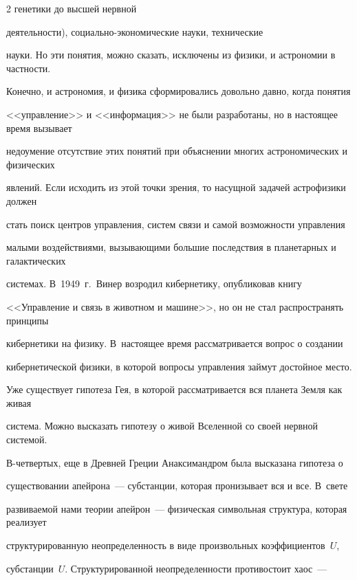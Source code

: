\begin{multicols}{2}
генетики до высшей нервной\linebreak


деятельности), социально-экономические науки, технические 


науки. Но эти понятия, можно сказать, исключены из физики, и астрономии в частности. 


Конечно, и астрономия, и физика сформировались довольно давно, когда понятия 


<<управ\-ле\-ние>> и <<информация>> не были разработаны, но в настоящее время вызывает 


недоумение отсутствие этих понятий при объяснении многих астрономических и физических 


явлений. Если исходить из этой точки зрения, то насущной задачей астрофизики должен 


стать поиск центров управ\-ле\-ния, систем связи и самой возможности управ\-ле\-ния 


малыми воздействиями, вызывающими большие последствия в планетарных и галактических 


сис\-те\-мах. В~1949~г.\ Винер возродил кибернетику, опубликовав книгу 


<<Управ\-ле\-ние и связь в животном и машине>>, но он не стал распространять принципы 


кибернетики на физику. В~настоящее время рассматривается вопрос о создании 


кибернетической физики, в которой вопросы управ\-ле\-ния займут достойное место.


      


      Уже существует гипотеза Гея, в которой рас\-смат\-ри\-ва\-ет\-ся вся планета Земля как живая 


сис\-те\-ма. Можно высказать гипотезу о живой Вселенной со своей нервной сис\-те\-мой.


      


      В-чет\-вер\-тых, еще в Древней Греции Анаксимандром была высказана гипотеза о 


существовании апейрона~--- субстанции, которая пронизывает вся и все. В~свете 


развиваемой нами теории апейрон~--- физическая символьная структура, которая реализует 


структурированную неопределенность в виде произвольных коэффициентов~$U$, 


субстанции~$U$. Структурированной неопределенности противостоит хаос~--- 



\end{multicols}
